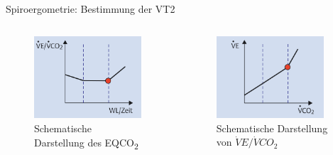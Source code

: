 \documentclass[colorBG,slideColor,9pt]{beamer}
\begin{document}
\begin{frame}{Spiroergometrie: Bestimmung der VT2}
\begin{columns}
	\begin{column}{5cm}
		\begin{figure}[H]
			\begin{center}
				\includegraphics[width=40mm]{Bilder/eqco2.png}
				\caption{Schematische Darstellung des EQCO\textsubscript{2}}
			\end{center}
		\end{figure}
	\end{column}
	\begin{column}{5cm}
		\begin{figure}[H]
			\begin{center}
				\includegraphics[width=40mm]{Bilder/field4.png}
				\caption{Schematische Darstellung von $\dot{V}E/\dot{V}CO_2$} 
			\end{center}
		\end{figure}
	\end{column}
\end{columns}
\end{frame}
\end{document}
